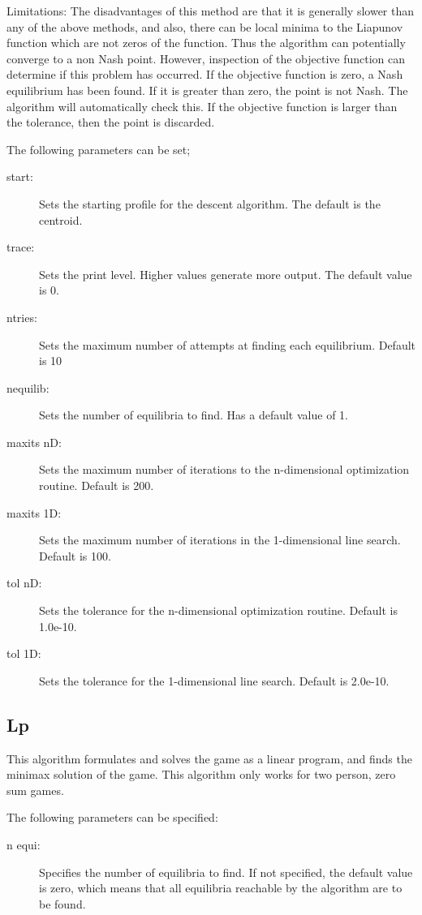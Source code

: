 Limitations: The disadvantages of this method are that it is generally
slower than any of the above methods, and also,  there can be local minima
to the Liapunov function which are not zeros of the function.  Thus the
algorithm can potentially converge to a non Nash point.  However,
inspection of the objective function can determine if this problem has
occurred.  If the objective function is zero, a Nash equilibrium has been
found. If it is greater than zero, the point is not Nash.  The algorithm
will automatically check this.  If the objective function is larger than the
tolerance, then the point is discarded.

The following parameters can be set;

\begin{description}
\item[start:] Sets the starting profile for the descent algorithm.  The
default is the centroid.
\item[trace:] Sets the print level.  Higher values generate more output.
The default value is 0.
\item[ntries:] Sets the maximum number of attempts at finding each
equilibrium. Default is 10
\item[nequilib:] Sets the number of equilibria to find.  Has a default
value of 1.  
\item[maxits nD:] Sets the maximum number of iterations to the
n-dimensional optimization routine.  Default is 200.
\item[maxits 1D:] Sets the maximum number of iterations in the
1-dimensional line search.  Default is 100.
\item[tol nD:] Sets the tolerance for the n-dimensional optimization
routine.  Default is 1.0e-10.
\item[tol 1D:] Sets the tolerance for the 1-dimensional line search.
Default is 2.0e-10.
\end{description}

\subsection{Lp}\label{Lp}
This algorithm formulates and solves the game as a linear program, and finds the 
minimax solution of the game.  This algorithm only works for two person, zero sum 
games.    

The following parameters can be specified:

\begin{description}
\item[n equi:] Specifies the number of equilibria to find.  If not specified,
the default value is zero, which means that all equilibria reachable by
the algorithm are to be found.
\end{description}

